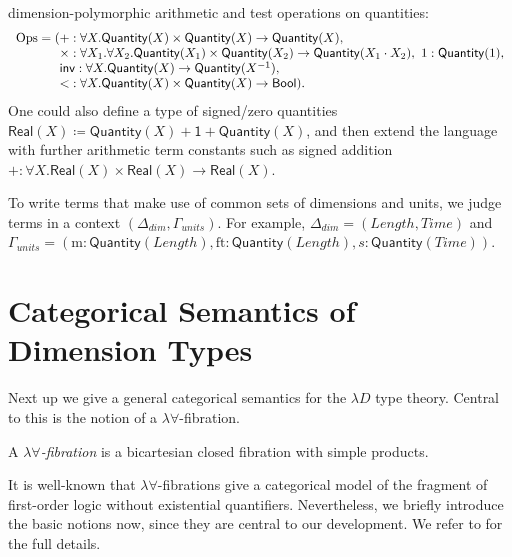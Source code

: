\documentclass[a4paper,UKenglish]{lipics}
\theoremstyle{plain}
\newcommand{\msf}[1]{\mathsf{#1}} %
\newcommand{\unitTy}{\msf{1}}
\newcommand{\qnt}{\msf{Quantity}}
\newcommand{\sreal}{\msf{Real}}
\newcommand{\bool}{\msf{Bool}}
\newcommand{\lengthDim}{\mathit{Length}}
\newcommand{\timeDim}{\mathit{Time}}
\newcommand{\Deltadim}{\ensuremath{\Delta_{dim}}}
\newcommand{\Gammaunits}{\ensuremath{\Gamma_{units}}}
\newcommand{\Dvar}{X}
\begin{document}
dimension-polymorphic arithmetic and test operations on quantities:
\[\begin{array}{r@{}l}\mathrm{Ops} = (
&+:\forall \Dvar. \qnt(\Dvar)\times  \qnt(\Dvar) \rightarrow \qnt(\Dvar),
\\&\times :\forall \Dvar_1. \forall \Dvar_2. \qnt(\Dvar_1)\times \qnt(\Dvar_2) \rightarrow \qnt(\Dvar_1 \cdot \Dvar_2),
\ 1:\qnt(1),
\\&\mathsf{inv}:\forall \Dvar.\qnt(\Dvar)\to \qnt (\Dvar^{-1}),
\\& {<}:\forall \Dvar.\qnt(\Dvar)\times \qnt(\Dvar)\to \bool)\text.
\end{array}\]
%
One could also define a type of signed/zero quantities $\sreal(\Dvar)\coloneqq \qnt(\Dvar)+\unitTy+\qnt(\Dvar)$, and then extend the language with further arithmetic term constants such as signed addition $+:\forall \Dvar.\sreal(\Dvar)\times \sreal(\Dvar)\to\sreal(\Dvar)$.

To write terms that make use of common sets of dimensions and units,
we judge terms in a context $(\Deltadim, \Gammaunits)$. For example,
$\Deltadim = (\lengthDim, \timeDim)$ and $\Gammaunits = (\mathrm{m} :
\qnt(\lengthDim), \mathrm{ft} : \qnt(\lengthDim), s :
\qnt(\timeDim))$.



\section{Categorical Semantics of Dimension Types} \label{sec:sem}
Next up we give a general categorical semantics for the $\lambda D$ type theory. Central to this is the notion of a $\lambda \forall$-fibration.

\begin{definition}
A \emph{$\lambda\forall$-fibration} is a bicartesian closed fibration with simple products.
\end{definition}

It is well-known that $\lambda \forall$-fibrations give a categorical model of the fragment of first-order logic without existential quantifiers. Nevertheless, we briefly introduce the basic notions now, since they are central to our development. We refer to \cite{jacobs1999categorical} for the full details.
\end{document}
